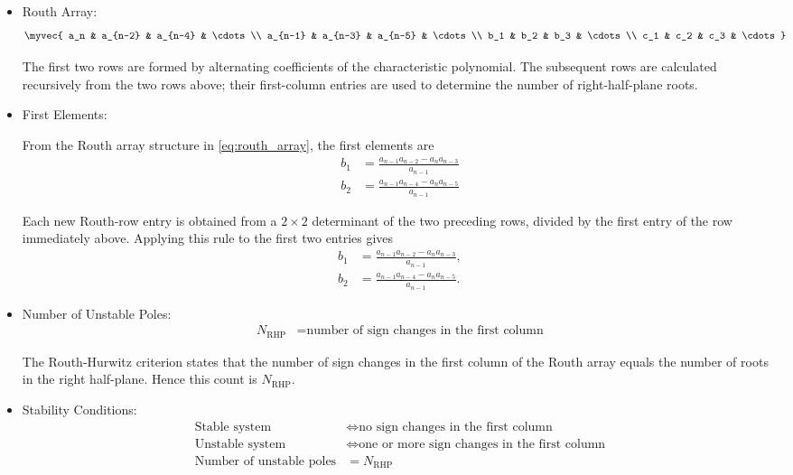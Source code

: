 \begin{enumerate}[label=\thesubsection.\arabic*, ref=\thesubsection.\theenumi,itemsep=0pt]
\begin{itemize}
\solution
The characteristic equation is obtained by setting the denominator polynomial of the system equal to zero:
\begin{align}
a_ns^n+a_{n-1}s^{n-1}+\cdots+a_1s+a_0&=0.
\end{align}
\item Routh Array:
\begin{align}
\myvec{
a_n & a_{n-2} & a_{n-4} & \cdots\\
a_{n-1} & a_{n-3} & a_{n-5} & \cdots\\
b_1 & b_2 & b_3 & \cdots\\
c_1 & c_2 & c_3 & \cdots
}
&\label{eq:routh_array}
\end{align}


\solution
The first two rows are formed by alternating coefficients of the characteristic polynomial. The subsequent rows are calculated recursively from the two rows above; their first-column entries are used to determine the number of right-half-plane roots.
\item First Elements:

From the Routh array structure in \eqref{eq:routh_array}, the first elements are
\begin{align}
b_1
&= \frac{a_{n-1}a_{n-2}-a_na_{n-3}}{a_{n-1}}
\label{eq:routh_b1}\\
b_2
&= \frac{a_{n-1}a_{n-4}-a_na_{n-5}}{a_{n-1}}
\label{eq:routh_b2}
\end{align}


\solution
Each new Routh-row entry is obtained from a $2\times2$ determinant of the two preceding rows, divided by the first entry of the row immediately above. Applying this rule to the first two entries gives
\begin{align}
b_1&=\frac{a_{n-1}a_{n-2}-a_na_{n-3}}{a_{n-1}},\\
b_2&=\frac{a_{n-1}a_{n-4}-a_na_{n-5}}{a_{n-1}}.
\end{align}
\item Number of Unstable Poles:
\begin{align}
N_{\mathrm{RHP}}
&= \text{number of sign changes in the first column}
\label{eq:routh_unstable_poles}
\end{align}


\solution
The Routh-Hurwitz criterion states that the number of sign changes in the first column of the Routh array equals the number of roots in the right half-plane. Hence this count is $N_{\mathrm{RHP}}$.
\item Stability Conditions:
\begin{align}
\text{Stable system}
&\iff \text{no sign changes in the first column}
\label{eq:routh_stable}\\
\text{Unstable system}
&\iff \text{one or more sign changes in the first column}
\label{eq:routh_unstable}\\
\text{Number of unstable poles}
&= N_{\mathrm{RHP}}
\label{eq:routh_rhp_count}
\end{align}



\end{itemize}
\end{enumerate}
